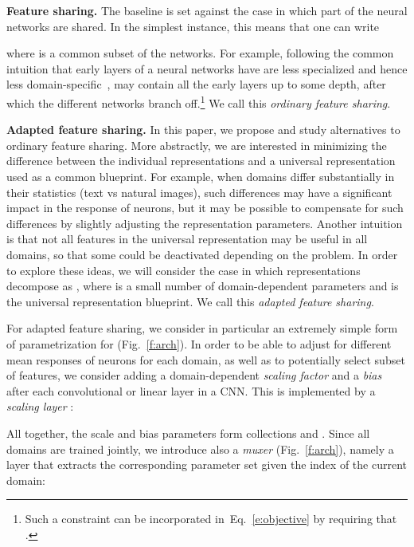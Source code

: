 \documentclass[10pt,twocolumn,letterpaper]{article}
\renewcommand{\paragraph}[1]{\par\medskip\noindent\textbf{#1}}
\begin{document}
\paragraph{Feature sharing.} The baseline is set against the case in which part of the neural networks  are shared. In the simplest instance, this means that one can write

where  is a common subset of the networks. For example, following the common intuition that early layers of a neural networks have are less specialized and hence less domain-specific~\cite{cimpoi14deep},  may contain all the early layers up to some depth, after which the different networks branch off.\footnote{Such a constraint can be incorporated in~Eq.~\ref{e:objective} by requiring that .} We call this \emph{ordinary feature sharing}.

\paragraph{Adapted feature sharing.} In this paper, we propose and study alternatives to ordinary feature sharing. More abstractly, we are interested in minimizing the difference between the individual representations  and a universal representation  used as a common blueprint. For example, when domains differ substantially in their statistics (\eg text vs natural images), such differences may have a significant impact in the response of neurons, but it may be possible to compensate for such differences by slightly adjusting the representation parameters. Another intuition is that not all features in the universal representation  may be useful in all domains, so that some could be deactivated depending on the problem. In order to explore these ideas, we will consider the case in which representations decompose as , where  is a small number of domain-dependent parameters and  is the universal representation blueprint. We call this \emph{adapted feature sharing}.

For adapted feature sharing, we consider in particular an extremely simple form of parametrization for  (Fig.~\ref{f:arch}). In order to be able to adjust for different mean responses of neurons for each domain, as well as to potentially select subset of features, we consider adding a domain-dependent \emph{scaling factor}   and a \emph{bias}  after each convolutional or linear layer in a CNN. This is implemented by a \emph{scaling layer} :

All together, the scale and bias parameters form collections  and . Since all domains are trained jointly, we introduce also a \emph{muxer} (Fig.~\ref{f:arch}), namely a layer that extracts the corresponding parameter set given the index  of the current domain:
\end{document}
